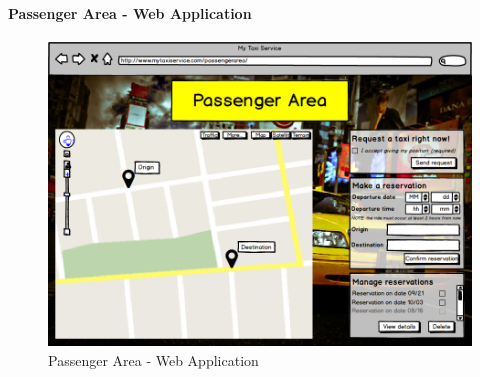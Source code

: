 \paragraph{Passenger Area - Web Application}
\begin{figure}[!h]
	\begin{center}
		\includegraphics[scale=0.45]{../SE2_MOCKUPS/WebAppPassengerArea.png}
		\caption{Passenger Area - Web Application}
	\end{center}	
\end{figure}
\newpage
